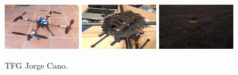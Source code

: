 \begin{figure}[H]
 \centering
    \includegraphics[width=0.3\textwidth]{imgs/JorgeCano1_1.jpg}
    \includegraphics[width=0.3\textwidth]{imgs/JorgeCano2_1.jpg}
    \includegraphics[width=0.3\textwidth]{imgs/JorgeCano3_1.png}
 \caption{TFG Jorge Cano.}
 \label{f:JorgeCano}
\end{figure} 





